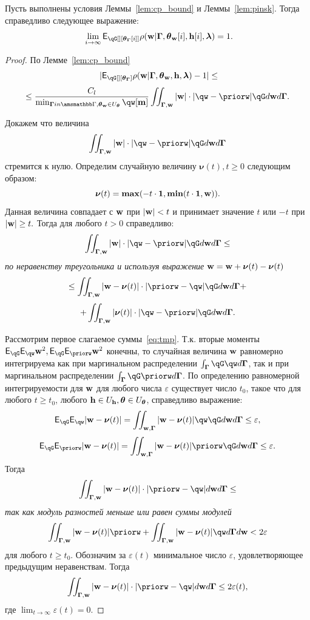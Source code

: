 \begin{theorem}
Пусть выполнены условия Леммы~\ref{lem:cp_bound} и  Леммы~\ref{lem:pinsk}.
Тогда справедливо следующее выражение:
\[
   \lim_{i \to \infty} \E_{\qG[][{\tetaG[i]}]} {\rho}(\w|\G, {\tetaw[i]}, {\h[i]}, \lam) = 1.
\]

\end{theorem}

\begin{proof}

По Лемме~\ref{lem:cp_bound}
\[
    |\E_{\qG[][{\tetaG}]} {\rho}(\w|\G, {\tetaw}, {\h}, \lam) - 1|  \leq
\]
\[
\leq  \frac{C_l}{\min_{\G in \Gb, \tetaw \in \Uteta} \qw[\mathbf{m}]}  \iint_{\G,\w} |\w| \cdot |\qw - \priorw|\qG d\w d\G.
\]

Докажем что величина
\[
    \iint_{\G,\w} |\w| \cdot |\qw - \priorw|\qG d\w d\G
\]
стремится к нулю.
Определим случайную величину $\boldsymbol{\nu}(t), t \geq 0$ следующим образом:
\[
    \boldsymbol{\nu}(t) = \boldsymbol{\max}(-t \cdot \mathbf{1}, \boldsymbol{\min}(t \cdot \mathbf{1}, \mathbf{w})).
\]
Данная величина совпадает с $\mathbf{w}$ при $|\mathbf{w}| < t$ и принимает значение $t$ или $-t$ при $|\mathbf{w}| \geq t.$
Тогда для любого $t>0$ справедливо:
\[
    \iint_{\G,\w} |\w| \cdot |\qw - \priorw|\qG d\w d\G \leq
\]
\textit{по неравенству треугольника и используя выражение }$\mathbf{w} = \mathbf{w} + \boldsymbol{\nu}(t) -\boldsymbol{\nu}(t)$
\begin{equation}
\label{eq:tmp}
    \leq    \iint_{\G,\w} |\w -\boldsymbol{\nu}(t)| \cdot |\priorw -\qw|\qG d\w d\G   +
\end{equation}
\[ +      \iint_{\G,\w} |\boldsymbol{\nu}(t)| \cdot |\qw - \priorw|\qG d\w d\G.
\]



Рассмотрим первое слагаемое суммы~\eqref{eq:tmp}. Т.к. вторые моменты $\E_{\qG}\E_{\qw} \w^2, \E_{\qG}\E_{\priorw} \w^2$ конечны, то случайная величина $\mathbf{w}$ равномерно интегрируема как при маргинальном распределении $\int_{\G}\qG\qw d\G$, так и при маргинальном распределении $\int_{\G}\qG\priorw d\G$.
По определению равномерной интегрируемости для $\mathbf{w}$ для любого числа $\varepsilon$ существует число $t_0$, такое что для любого $t \geq t_0$, любого $\mathbf{h} \in U_{\mathbf{h}}, \boldsymbol{\theta} \in U_{\boldsymbol{\theta}}$,  справедливо выражение:
\[
    \E_{\qG}\E_{\qw}|\w - \boldsymbol{\nu}(t)| = \iint_{\w,\G}|\w - \boldsymbol{\nu}(t)|\qw\qG d\w d\G \leq \varepsilon,
\]
\[
    \E_{\qG}\E_{\priorw}|\w - \boldsymbol{\nu}(t)| = \iint_{\w,\G}|\w - \boldsymbol{\nu}(t)|\priorw\qG d\w d\G \leq \varepsilon.
\]
Тогда
\[
   \iint_{\G,\w} |\w -\boldsymbol{\nu}(t)|\cdot|\priorw  - \qw| d\w d\G   \leq  
\]
\textit{так как модуль разностей меньше или равен суммы модулей}
\[
  \iint_{\G,\w} |\w -\boldsymbol{\nu}(t)|\priorw  +   \iint_{\G,\w} |\w -\boldsymbol{\nu}(t)|\qw d\G d\w < 2 \varepsilon
\]
для любого $t \geq t_0$. Обозначим за $\varepsilon(t)$ минимальное число $\varepsilon$, удовлетворяющее предыдущим неравенствам. Тогда
$$
 \iint_{\G,\w} |\w -\boldsymbol{\nu}(t)|\cdot|\priorw  - \qw| d\w d\G  \leq 2 \varepsilon(t),
$$
где $\lim_{t \to \infty} \varepsilon(t) = 0$.


\end{proof}
